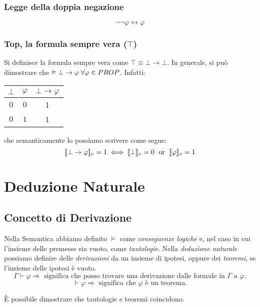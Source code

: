 \documentclass[a4paper,12pt]{report}
\newcommand\val[1]{\llbracket#1\rrbracket}
\begin{document}
\subsection{Legge della doppia negazione}
\[ \neg\neg\varphi \leftrightarrow \varphi \]

\subsection{Top, la formula sempre vera ($\top$)}
Si definisce la formula sempre vera come $\top \equiv \bot \to \bot$. In generale, si pu\`{o} dimostrare che $\vDash \bot \to \varphi \thickspace \forall \varphi \in PROP$. Infatti:
\begin{center}
\begin{tabular}{c c| c}
$\bot$ & $\varphi$ & $\bot \to \varphi$ \\
\hline
$0$ & $0$ & 1 \\
$0$ & $1$ & 1 
\end{tabular}
\end{center}
che semanticamente lo possiamo scrivere come segue:
\[ \val{\bot \to \varphi}_v = 1 \iff \val{\bot}_v = 0 \thickspace \text{ or }\thickspace \val{\varphi}_v = 1\]


\chapter{Deduzione Naturale}

\section{Concetto di Derivazione}

Nella Semantica abbiamo definito $\vDash$ come \emph{conseguenze logiche} e, nel caso in cui l'insieme delle premesse sia vuoto, come \emph{tautologie}. Nella \emph{deduzione naturale} possiamo definire delle \emph{derivazioni} da un insieme di ipotesi, oppure dei \emph{teoremi}, se l'insieme delle ipotesi \`{e} vuoto.
\[ \Gamma \vdash \varphi \Rightarrow \text{ significa che posso trovare una derivazione dalle formule in $\Gamma$ a $\varphi$}.\]
\[ \vdash \varphi \Rightarrow \text{ significa che $\varphi$ \`{e} un teorema}.\]

\`{E} possibile dimostrare che tautologie e teoremi coincidono.
\end{document}
